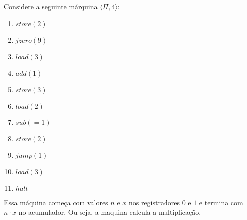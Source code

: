 \begin{example}
  Considere a seguinte márquina $\langle \Pi, 4 \rangle$:
  \begin{multicols}{2}
    \begin{enumerate}
    \item $store(2)$
    \item $jzero(9)$
    \item $load(3)$
    \item $add(1)$
    \item $store(3)$
      \columnbreak
    \item $load(2)$
    \item $sub(=1)$
    \item $store(2)$
    \item $jump(1)$
    \item $load(3)$
    \item $halt$
    \end{enumerate}
  \end{multicols}
  
  Essa máquina começa com valores $n$ e $x$ nos registradores $0$ e $1$ e termina com $n \cdot x$ no acumulador.
  Ou seja, a maquina calcula a multiplicação.


\end{example}
